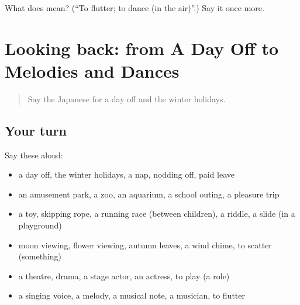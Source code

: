 \begin{tcolorbox}[breakable,colback=teal!4,colframe=teal!35!black,title={Before you move on}]
What does  mean? (\textquotedblleft{}To flutter; to dance (in the air)\textquotedblright{}.) Say it once more.
\end{tcolorbox}
\section[(dialogue)]{Looking back: from A Day Off to Melodies and Dances}

\label{lesson:JA-R503-review-498-503}



\begin{quote}
Say the Japanese for a day off and the winter holidays.
\end{quote}

\subsection*{Your turn}
Say these aloud:

\begin{itemize}
\raggedright
  \item a day off, the winter holidays, a nap, nodding off, paid leave
  \item an amusement park, a zoo, an aquarium, a school outing, a pleasure trip
  \item a toy, skipping rope, a running race (between children), a riddle, a slide (in a playground)
  \item moon viewing, flower viewing, autumn leaves, a wind chime, to scatter (something)
  \item a theatre, drama, a stage actor, an actress, to play (a role)
  \item a singing voice, a melody, a musical note, a musician, to flutter
\end{itemize}

